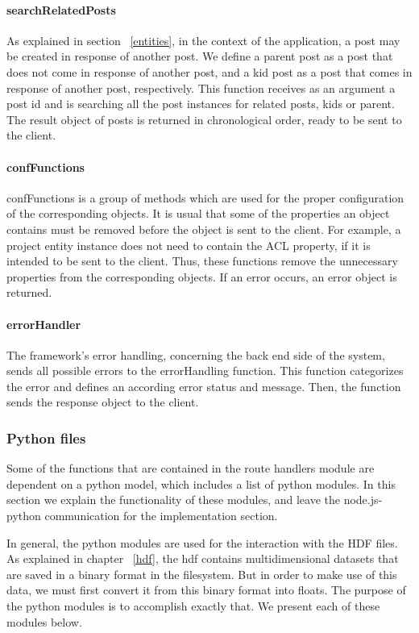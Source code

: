 \paragraph{searchRelatedPosts}
As explained in section ~\ref{entities}, in the context of the application, a post may be created in response of another post. We define a parent post as a post that does not come in response of another post, and a kid post as a post that comes in response of another post, respectively. This function receives as an argument a post id and is searching all the post instances for related posts, kids or parent. The result object of posts is returned in chronological order, ready to be sent to the client.

\paragraph{confFunctions}
confFunctions is a group of methods which are used for the proper configuration of the corresponding objects. It is usual that some of the properties an object contains must be removed before the object is sent to the client. For example, a project entity instance does not need to contain the ACL property, if it is intended to be sent to the client. Thus, these functions remove the unnecessary properties from the corresponding objects. If an error occurs, an error object is returned.

\paragraph{errorHandler}
The framework's error handling, concerning the back end side of the system, sends all possible errors to the errorHandling function. This function categorizes the error and defines an according error status and message. Then, the function sends the response object to the client.
	
\subsubsection{Python files}
\label{pyfiles}
Some of the functions that are contained in the route handlers module are dependent on a python model, which includes a list of python modules. In this section we explain the functionality of these modules, and leave the node.js- python communication for the implementation section. \par 
	In general, the python modules are used for the interaction with the HDF files. As explained in chapter ~\ref{hdf}, the hdf contains multidimensional datasets that are saved in a binary format in the filesystem. But in order to make use of this data, we must first convert it from this binary format into floats. The purpose of the python modules is to accomplish exactly that. We present each of these modules below.
	
